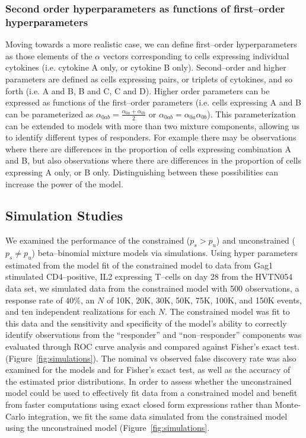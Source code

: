 \documentclass[11pt]{article}
\begin{document}
\subsubsection*{Second order hyperparameters as functions of first--order hyperparameters}
Moving towards a more realistic case, we can define first--order hyperparameters as those elements of the $\alpha$ vectors corresponding to cells expressing individual cytokines (i.e. cytokine A only, or cytokine B only). Second--order and higher parameters are defined as cells expressing pairs, or triplets of cytokines, and so forth  (i.e. A and B, B and C, C and D). Higher order parameters can be expressed as functions of the first--order parameters (i.e. cells expressing A and B can be parameterized as $\alpha_{0ab} = \frac{\alpha_{0a}+\alpha_{0b}}{2}$ or $\alpha_{0ab}=\alpha_{0a}\alpha_{0b}$). This parameterization can be extended to models with more than two mixture components, allowing us to identify different types of responders. For example there may be observations where there are differences in the proportion of cells expressing combination A and B, but also observations where there are differences in the proportion of cells expressing A only, or B only. Distinguishing between these possibilities can increase the power of the model.


\subsection*{Simulation Studies}
We examined the performance of the constrained ($p_s>p_u$) and unconstrained ($p_s \ne p_u$) beta--binomial mixture models via simulations. Using hyper parameters estimated from the model fit of the constrained model to data from Gag1 stimulated CD4--positive, IL2 expressing T--cells on day 28 from the HVTN054 data set, we simulated data from the constrained model with 500 observations, a response rate of 40\%, an $N$ of 10K, 20K, 30K, 50K, 75K, 100K, and 150K events, and ten independent realizations for each $N$. The constrained model was fit to this data and the sensitivity and specificity of the model's ability to correctly identify observations from the ``responder'' and ``non--responder'' components was evaluated through ROC curve analysis and compared against Fisher's exact test. (Figure~\ref{fig:simulations}). The nominal vs observed false discovery rate was also examined for the models and for Fisher's exact test, as well as the accuracy of the estimated prior distributions. In order to assess whether the unconstrained model could be used to effectively fit data from a constrained model and benefit from faster computations using exact closed form expressions rather than Monte-Carlo integration, we fit the same data simulated from the constrained model using the unconstrained model (Figure~\ref{fig:simulations}. 
\end{document}

